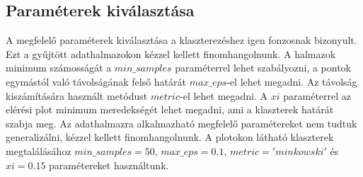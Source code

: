\documentclass[12pt,a4paper]{article}
\begin{document}
\subsection{Paraméterek kiválasztása}
A megfelelő paraméterek kiválasztása a klaszterezéshez igen fonzosnak bizonyult. Ezt a gyűjtött adathalmazokon kézzel kellett finomhangolnunk.
A halmazok minimum számosságát a \begin{math}min\_samples\end{math} paraméterrel lehet szabályozni, a pontok egymástól való távolságának
felső határát \begin{math}max\_eps\end{math}-el lehet megadni. Az távolság kiszámítására használt metódust \begin{math}metric\end{math}-el
lehet megadni. A \begin{math}xi\end{math} paraméterrel az elérési plot minimum meredekségét lehet megadni, ami a klaszterek határát szabja meg.
Az adathalmazra alkalmazható megfelelő paramétereket nem tudtuk generalizálni, kézzel kellett finomhangolnunk. A plotokon látható klaszterek
megtalálásához \begin{math}min\_samples=50\end{math}, \begin{math}max\_eps=0.1\end{math}, \begin{math}metric='minkowski'\end{math} és \begin{math}xi=0.15\end{math}
paramétereket használtunk.

\newpage
\end{document}
